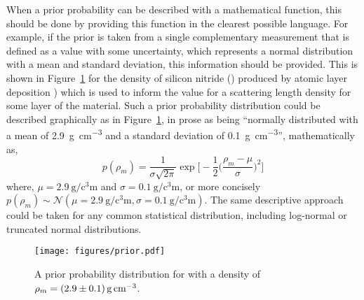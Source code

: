 \documentclass[reprint,superscriptaddress,aps,amsmath,linenumbers]{revtex4-2}
\begin{document}
When a prior probability can be described with a mathematical function, this should be done by providing this function in the clearest possible language. 
For example, if the prior is taken from a single complementary measurement that is defined as a value with some uncertainty, which represents a normal distribution with a mean and standard deviation, this information should be provided. 
This is shown in Figure~\ref{fig:prior} for the density of silicon nitride () produced by atomic layer deposition \cite{knoops_atomic_2015}) which is used to inform the value for a scattering length density for some layer of the material. 
Such a prior probability distribution could be described graphically as in Figure~\ref{fig:prior}, in prose as being ``normally distributed with a mean of \SI{2.9}{\gram\per\cubic\centi\meter} and a standard deviation of \SI{0.1}{\gram\per\cubic\centi\meter}'', mathematically as, 
%
\begin{equation}
  p(\rho_m) = \frac{1}{\sigma\sqrt{2\pi}}\exp\Bigg[-\frac{1}{2}\bigg(\frac{\rho_m-\mu}{\sigma}\bigg)^2\Bigg]
\end{equation}
%
where, $\mu=\SI{2.9}{\gram\per\cubic\centi\meter}$ and $\sigma=\SI{0.1}{\gram\per\cubic\centi\meter}$, or more concisely $p(\rho_m) \sim \mathcal{N}(\mu=\SI{2.9}{\gram\per\cubic\centi\meter}, \sigma=\SI{0.1}{\gram\per\cubic\centi\meter})$. 
The same descriptive approach could be taken for any common statistical distribution, including log-normal or truncated normal distributions. 
%
\begin{figure}
  \texttt{[image: figures/prior.pdf]}
  \caption{
    A prior probability distribution for  with a density of $\rho_m=\SI{2.9\pm0.1}{\gram\per\cubic\centi\meter}$. 
  }
  \label{fig:prior}
\end{figure}
%
\end{document}
